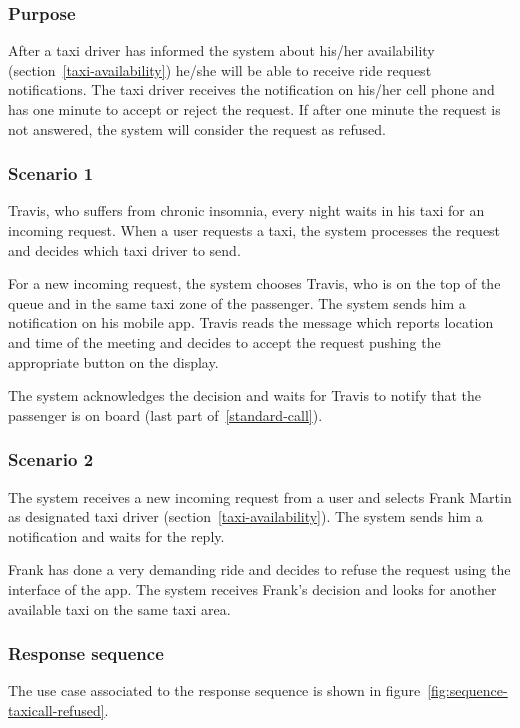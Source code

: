 \label{driver-notification}
\subsubsection{Purpose}

After a taxi driver has informed the system about his/her availability (section~\ref{taxi-availability})
he/she will be able to receive ride request notifications. The taxi driver receives the notification on his/her cell phone and has one minute to accept or reject the request. If after one minute the request is not answered, the system will consider the request as refused.

\subsubsection{Scenario 1}
Travis, who suffers from chronic insomnia, every night waits in his taxi for an incoming request. When a user requests a taxi, the system processes the request and decides which taxi driver to send.

For a new incoming request, the system chooses Travis, who is on the top of the queue and in the same taxi zone of the passenger. The system sends him a notification on his mobile app. Travis reads the message which reports location and time of the meeting and decides to accept the request pushing the appropriate button on the display.

The system acknowledges the decision and waits for Travis to notify that the passenger is on board (last part of~\ref{standard-call}).

\subsubsection{Scenario 2}
The system receives a new incoming request from a user and selects Frank Martin as designated taxi driver (section~\ref{taxi-availability}).
The system sends him a notification and waits for the reply.

Frank has done a very demanding ride and decides to refuse the request using the interface of the app. The system receives Frank's decision and looks for another available taxi on the same taxi area.

\subsubsection{Response sequence}
The use case associated to the response sequence is shown in figure~\ref{fig:sequence-taxicall-refused}.

